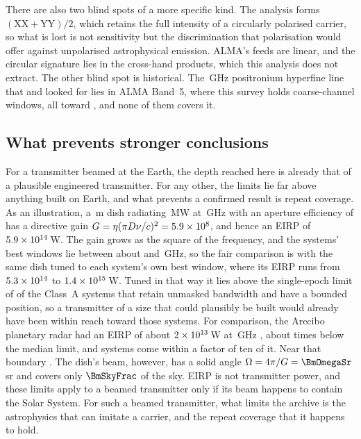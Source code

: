 There are also two blind spots of a more specific kind. The analysis forms
$(\mathrm{XX}+\mathrm{YY})/2$, which retains the full intensity of a
circularly polarised carrier, so what is lost is not sensitivity but the
discrimination that polarisation would offer against unpolarised
astrophysical emission. ALMA's feeds are linear, and the circular signature
lies in the cross-hand products, which this analysis does not extract. The
other blind spot is historical. The \SbPriorFreqGHz\,GHz positronium
hyperfine line that \citet{Steffes1994} and \citet{Mauersberger1996} looked
for lies in ALMA Band~5, where this survey holds \LnBFiveWin{} coarse-channel
windows, all toward \LnBFiveStars, and none of them covers it.

\subsection{What prevents stronger conclusions}
\label{sec:mmdifferent}

For a transmitter beamed at the Earth, the depth reached here is already
that of a plausible engineered transmitter. For any other, the limits lie
far above anything built on Earth, and what prevents a confirmed result is
repeat coverage. As an illustration, a \BenchDiam\,m dish
radiating \BenchPowerMW\,MW at \BenchFreqGHz\,GHz with an aperture efficiency
of \BenchEta{} has a directive gain $G=\eta(\pi D\nu/c)^{2}=5.9\times10^{8}$, and
hence an EIRP of $5.9\times10^{14}$\,W. The gain grows as the square of the
frequency, and the systems' best windows lie between about \NtBestNuLo{} and
\NtBestNuHi\,GHz, so the fair comparison is with the same dish tuned to
each system's own best window, where its EIRP runs from
$5.3\times10^{14}$ to $1.4\times10^{15}$\,W. Tuned in that way it lies
above the single-epoch limit of \BenchNSysTuned{} of the \NSysALimSum{}
Class~A systems that retain unmasked bandwidth and have a bounded position,
so a transmitter of a size that could plausibly be built would already have
been within reach toward those systems. For comparison, the Arecibo planetary radar had an EIRP
of about $2\times10^{13}$\,W at \AroFreqGHz\,GHz \citep{EarthDetectingEarth2025},
about \AroMedMult{} times below the median limit, and \AroNSysTen{}
systems come within a factor of ten of it. Near that boundary
\AroTenEdgeClause. The dish's beam, however, has a solid
angle $\Omega=4\pi/G=\BmOmegaSr$\,sr and covers only $\BmSkyFrac$ of the sky.
EIRP is not transmitter power, and these limits apply to a beamed
transmitter only if its beam happens to contain the Solar System. For such
a beamed transmitter, what limits the archive is the astrophysics that can
imitate a carrier, and the repeat coverage that it happens to hold.

